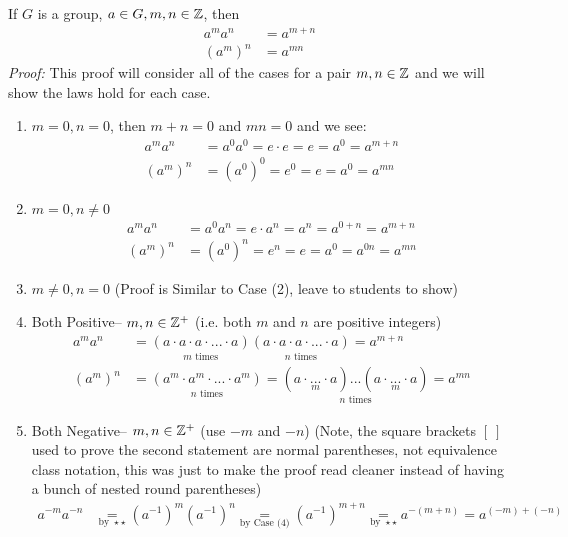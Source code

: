 \begin{proposition}
If $G$ is a group, $a\in G, m,n\in {\mathbb{ Z}}$, then 
\begin{align}
    a^m a^n&=a^{m+n} \nonumber \\
    (a^m)^n&= a^{mn} \nonumber
\end{align}
\textit{Proof:} This proof will consider all of the cases for a pair $m,n\in {\mathbb{ Z}}$ and we will show the laws hold for each case.
\begin{enumerate}[label=Case \arabic*:]
    \item $m=0,n=0$, then $m+n=0$ and $mn=0$ and we see:
    \begin{align}
        a^ma^n&=a^0a^0=e\cdot e=e=a^0=a^{m+n} \nonumber \\
        (a^m)^n&=(a^0)^0=e^0=e=a^0=a^{mn} \nonumber
    \end{align}
    \item $m=0, n\neq 0$
    \begin{align}
        a^ma^n&=a^0a^n=e\cdot a^n=a^n=a^{0+n}=a^{m+n} \nonumber \\
        (a^m)^n&=(a^0)^n=e^n=e=a^0=a^{0n}=a^{mn} \nonumber
    \end{align}
    \item $m\neq 0, n=0$ (Proof is Similar to Case (2), leave to students to show)
    \item Both Positive-- $m,n\in {\mathbb{ Z}}^+$ (i.e. both $m$ and $n$ are positive integers)
    \begin{align}
        a^ma^n&=\underset{m\text{ times}}{(a\cdot a\cdot a \cdot ... \cdot a)}\underset{n \text{ times}}{(a\cdot a\cdot a \cdot ... \cdot a)}=a^{m+n} \nonumber \\
        (a^m)^n&=\underset{n\text{ times}}{(a^m\cdot a^m\cdot ... \cdot a^m)}=\underset{n \text{ times}}{(\underset{m }{a\cdot ... \cdot a})...(\underset{m}{a\cdot ... \cdot a})}=a^{mn}\nonumber
    \end{align}
    \item Both Negative-- $m,n\in {\mathbb{ Z}}^+$ (use $-m$ and $-n$) (Note, the square brackets $[\ ]$ used to prove the second statement are normal parentheses, not equivalence class notation, this was just to make the proof read cleaner instead of having a bunch of nested round parentheses)
    \begin{align}
        a^{-m}a^{-n}& \underset{\text{by }\star\star}{=} (a^{-1})^m(a^{-1})^n \underset{\text{by Case (4)}}{=} (a^{-1})^{m+n} \underset{\text{by }\star\star}{=} a^{-(m+n)}=a^{(-m)+(-n)} \nonumber \\

\end{align}
\end{enumerate}
\end{proposition}

